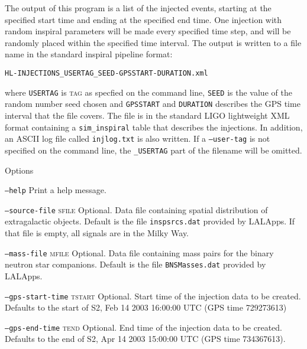 \begin{entry}
The output of this program  is  a  list  of  the  injected events,  starting
at  the specified start time and ending at the specified end time.  One 
injection with random inspiral parameters will be made every specified time
step, and will be randomly placed within the specified time interval.  
The output is written to a file name in the standard inspiral pipeline format:
\begin{center}
\begin{verbatim}
HL-INJECTIONS_USERTAG_SEED-GPSSTART-DURATION.xml
\end{verbatim}
\end{center}
where \verb$USERTAG$ is \textsc{tag} as specfied on the command line, 
\verb$SEED$ is the  value  of  the random number seed chosen and 
\verb$GPSSTART$ and \verb$DURATION$ describes the GPS time interval that
the file covers. The file is in the standard LIGO lightweight XML format
containing a \texttt{sim\_inspiral} table that describes the injections.
In addition, an ASCII log file called \verb$injlog.txt$ is also written.
If a \texttt{--user-tag} is not specified on the command line, the
\texttt{\_USERTAG} part of the filename will be omitted.

\item[Options]\leavevmode
\begin{entry}
\item[\texttt{--help}] Print a help message.

\item[\texttt{--source-file} \textsc{sfile}]
Optional. Data file containing spatial distribution of  extragalactic  objects.
Default  is  the file \verb+inspsrcs.dat+ provided by LALApps. If that file is 
empty, all signals are in the Milky Way.

\item[\texttt{--mass-file} \textsc{mfile}]
Optional. Data file containing mass pairs  for  the binary  neutron  star
companions.   Default is the file \verb+BNSMasses.dat+ provided by LALApps.

\item[\texttt{--gps-start-time} \textsc{tstart}]
Optional.  Start time of the injection data to be created. Defaults to the
start of S2, Feb 14 2003 16:00:00 UTC (GPS time 729273613)

\item[\texttt{--gps-end-time} \textsc{tend}]
Optional. End time of the injection data to be created. Defaults to the end of
S2, Apr 14 2003 15:00:00 UTC (GPS time 734367613).


\end{entry}
\end{entry}

